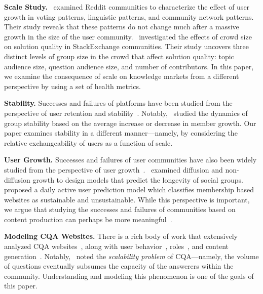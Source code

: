 \textbf{Scale Study.}~\citet{lin2017} examined Reddit communities to characterize the effect of user growth in voting patterns, linguistic patterns, and community network patterns. Their study reveals that these patterns do not change much after a massive growth in the size of the user community.~\citet{tausczik2017} investigated the effects of crowd size on solution quality in StackExchange communities. Their study uncovers three distinct levels of group size in the crowd that affect solution quality: topic audience size, question audience size, and number of contributors. In this paper, we examine the consequence of scale on knowledge markets from a different perspective by using a set of health metrics.

\textbf{Stability.} Successes and failures of platforms have been studied from the perspective of user retention and stability~\cite{patil2013, garcia2013, kapoor2014, ellis2016}. Notably,~\citet{patil2013} studied the dynamics of group stability based on the average increase or decrease in member growth. Our paper examines stability in a different manner---namely, by considering the relative exchangeability of users as a function of scale.

\textbf{User Growth.} Successes and failures of user communities have also been widely studied from the perspective of user growth~\cite{Kumar2006, Backstrom2006, kairam2012, Ribeiro2014, zang2016}.~\citet{kairam2012} examined diffusion and non-diffusion growth to design models that predict the longevity of social groups.~\citet{Ribeiro2014} proposed a daily active user prediction model which classifies membership based websites as sustainable and unsustainable. While this perspective is important, we argue that studying the successes and failures of communities based on content production can perhaps be more meaningful~\cite{kraut2014, zhu2014, zhu2014niche}.

\textbf{Modeling CQA Websites.} There is a rich body of work that extensively analyzed CQA websites~\cite{Adamic2008, chen2010, anderson2012, wang2013, srba2016}, along with user behavior~\cite{zhang2007, liu2011, pal2012, hanrahan2012, upadhyay2017}, roles~\cite{furtado2013, kumar2016}, and content generation~\cite{baezaYates2015, Yang2015, ferrara2017}. Notably,~\citet{Yang2015} noted the \emph{scalability problem} of CQA---namely, the volume of questions eventually subsumes the capacity of the answerers within the community. Understanding and modeling this phenomenon is one of the goals of this paper.

